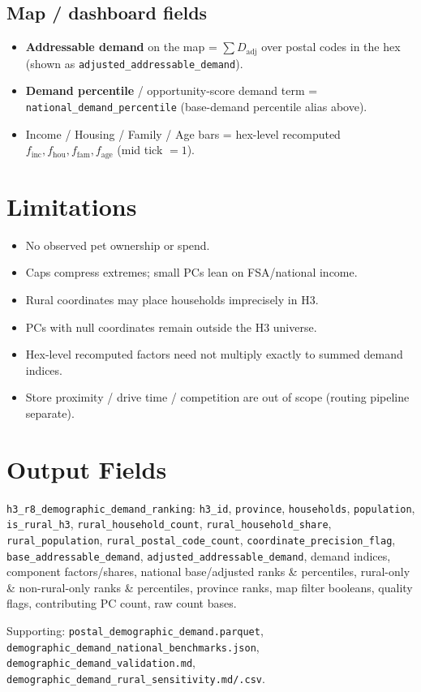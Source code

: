 \documentclass[10pt]{article}
\begin{document}
\subsection*{Map / dashboard fields}
\begin{itemize}
  \item \textbf{Addressable demand} on the map = $\sum D_{\text{adj}}$ over postal codes in the hex (shown as \texttt{adjusted\_addressable\_demand}).
  \item \textbf{Demand percentile} / opportunity-score demand term = \texttt{national\_demand\_percentile} (base-demand percentile alias above).
  \item Income / Housing / Family / Age bars = hex-level recomputed $f_{\text{inc}},f_{\text{hou}},f_{\text{fam}},f_{\text{age}}$ (mid tick $=1$).
\end{itemize}

\section{Limitations}
\begin{itemize}
  \item No observed pet ownership or spend.
  \item Caps compress extremes; small PCs lean on FSA/national income.
  \item Rural coordinates may place households imprecisely in H3.
  \item PCs with null coordinates remain outside the H3 universe.
  \item Hex-level recomputed factors need not multiply exactly to summed demand indices.
  \item Store proximity / drive time / competition are out of scope (routing pipeline separate).
\end{itemize}

\section{Output Fields}
\texttt{h3\_r8\_demographic\_demand\_ranking}: \texttt{h3\_id}, \texttt{province}, \texttt{households}, \texttt{population}, \texttt{is\_rural\_h3}, \texttt{rural\_household\_count}, \texttt{rural\_household\_share}, \texttt{rural\_population}, \texttt{rural\_postal\_code\_count}, \texttt{coordinate\_precision\_flag}, \texttt{base\_addressable\_demand}, \texttt{adjusted\_addressable\_demand}, demand indices, component factors/shares, national base/adjusted ranks \& percentiles, rural-only \& non-rural-only ranks \& percentiles, province ranks, map filter booleans, quality flags, contributing PC count, raw count bases.

Supporting: \texttt{postal\_demographic\_demand.parquet}, \texttt{demographic\_demand\_national\_benchmarks.json}, \texttt{demographic\_demand\_validation.md}, \texttt{demographic\_demand\_rural\_sensitivity.md/.csv}.
\end{document}
